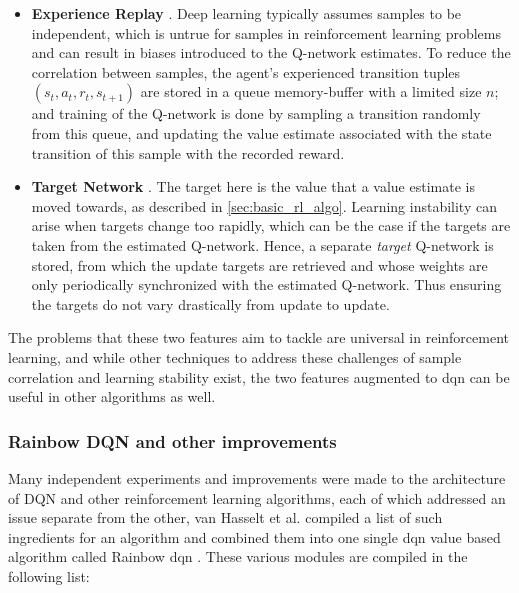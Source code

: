 \documentclass[../report.tex]{subfiles}
\begin{document}
\begin{itemize}
    \item \textbf{Experience Replay} \cite{dqn}. Deep learning typically assumes samples to be independent, which is untrue for samples in reinforcement learning problems and can result in biases introduced to the Q-network estimates. To reduce the correlation between samples, the agent's experienced transition tuples $(s_t, a_t, r_t, s_{t+1})$ are stored in a queue memory-buffer with a limited size $n$; and training of the Q-network is done by sampling a transition randomly from this queue, and updating the value estimate associated with the state transition of this sample with the recorded reward.
    \item \textbf{Target Network} \cite{dqn}. The target here is the value that a value estimate is moved towards, as described in \autoref{sec:basic_rl_algo}. Learning instability can arise when targets change too rapidly, which can be the case if the targets are taken from the estimated Q-network. Hence, a separate \textit{target} Q-network is stored, from which the update targets are retrieved and whose weights are only periodically synchronized with the estimated Q-network. Thus ensuring the targets do not vary drastically from update to update. 
\end{itemize}

The problems that these two features aim to tackle are universal in reinforcement learning, and while other techniques to address these challenges of sample correlation and learning stability exist, the two features augmented to \ac{dqn} can be useful in other algorithms as well.

\subsubsection{Rainbow DQN and other improvements}

Many independent experiments and improvements were made to the architecture of DQN and other reinforcement learning algorithms, each of which addressed an issue separate from the other, van Hasselt et al. compiled a list of such ingredients for an algorithm and combined them into one single \ac{dqn} value based algorithm called Rainbow \ac{dqn} \cite{rainbow_dqn}. These various modules are compiled in the following list:
\end{document}
